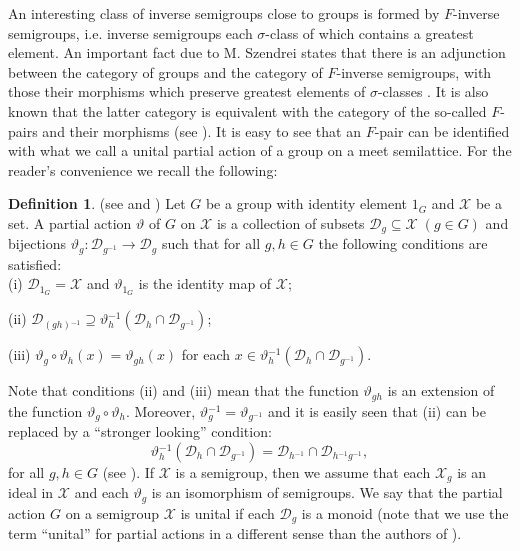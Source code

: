 \documentclass{amsart}
\newcommand{\D}{{\mathcal D}}
\newcommand{\0}{{\vartheta}}
\newcommand{\X}{{\mathcal X}}
\newcommand{\m}{{}^{-1}}
\theoremstyle{definition}
\newtheorem{defn}[thm]{Definition}
\theoremstyle{remark}
\numberwithin{equation}{section}
\newtheorem*{Theorem A}{\textbf{Theorem A}}
\newtheorem*{Corollary E}{\textbf{Corollary E}}
\newtheorem*{Corollary F}{\textbf{Corollary F}}
\newtheorem*{Theorem B}{\textbf{Theorem B}}
\newtheorem*{Theorem C}{\textbf{Theorem C}}
\newtheorem*{Theorem D}{\textbf{Theorem B}}
\newtheorem*{p a}{\textbf{Proof of  Theorem A}}
\newtheorem*{p b}{\textbf{Proof of Theorem B}}
\newtheorem*{p c}{\textbf{Proof of  Theorem C}}
\newtheorem*{p d}{\textbf{Proof of  Theorem D}}
\begin{document}
An interesting class of inverse semigroups close to groups is formed by $F$-inverse semigroups, i.e.   inverse semigroups each  $\sigma $-class of which contains a greatest element. An important fact due to M. Szendrei states that there is an adjunction between the category of groups and the category of $F$-inverse semigroups, with those their morphisms which preserve greatest elements  of  $\sigma $-classes  \cite{Szendrei}. It is also known that the latter category is equivalent with the category of the so-called $F$-pairs and their morphisms (see \cite[VII.6]{Petrich1984}).   It is easy to see  that an $F$-pair can be identified with what we call a unital partial action of a group on a meet semilattice. For the reader's convenience we recall  the  following: 

\begin{defn}\label{def:ParGrAcOnSet}(see \cite{Exel1998} and \cite{ExelBook})   Let $G$ be a group with identity element $1_G$ and $\X$ be a set.  A partial action ${\0}$ of
$G$ on  $\X$ is a collection of  subsets ${\D}_g \subseteq \X \; (g \in G)$ and bijections
$ {\0}_g : {\D}_{g\m} \to  {\D}_g$ such that for all $g,h \in G$ the following conditions are satisfied:\\

 (i) $\D_{1_G} = \X$ and ${\0}_{1_G}$ is the identity map of $\X$;

 (ii) $\D_{(gh)\m} \supseteq {\0}\m_h({\D}_h \cap {\D}_{g\m})$;

 (iii) ${\0}_g \circ {\0}_h (x) = {\0}_{gh}(x)$ for each $x \in {\0}\m_h ({\D}_h \cap {\D}_{g\m})$.\\
\end{defn}

Note that conditions (ii) and (iii) mean that the function ${\0}_{gh}$ is an extension of the function ${\0}_g \circ
{\0}_h $. Moreover, $\0\m _g = \0_{g\m}$ and it is easily seen that  (ii) can be replaced by a ``stronger looking'' condition: 
\begin{equation}\label{eq:StrongerLooking}
{\0}\m_h({\D}_h \cap
{\D}_{g\m}) = \D_{h\m} \cap \D_{h\m g\m},
\end{equation} for all $g,h\in G$ (see \cite{ExelBook}). If $\X $ is a semigroup, then we assume that each $\X _g$ is an ideal in $\X $ and each $\0 _g$ is an isomorphism of semigroups. We say that the partial action $G$ on a semigroup $\X $ is unital if each $\D _g$ is a monoid (note that we use the term ``unital'' for partial actions in a different sense than the authors of \cite{KL}).
\end{document}
